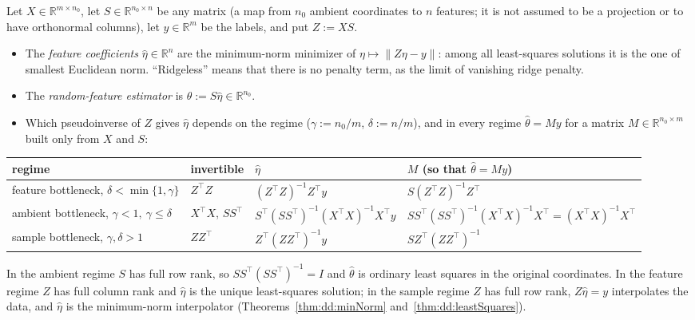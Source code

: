 \begin{definition}\label{def:dd:randomFeatures}
Let $X\in\mathbb R^{m\times n_0}$, let $S\in\mathbb R^{n_0\times n}$ be any matrix (a map from $n_0$ ambient coordinates to $n$ features; it is not assumed to be a projection or to have orthonormal columns), let $y\in\mathbb R^m$ be the labels, and put $Z:=XS$.
\begin{itemize}
  \item The \emph{feature coefficients} $\hat\eta\in\mathbb R^n$ are the minimum-norm minimizer of $\eta\mapsto\|Z\eta-y\|$: among all least-squares solutions it is the one of smallest Euclidean norm. ``Ridgeless'' means that there is no
  penalty term, as the limit of vanishing ridge penalty.
  \item The \emph{random-feature estimator} is $\hat\theta:=S\hat\eta\in\mathbb R^{n_0}$.
  \item Which pseudoinverse of $Z$ gives $\hat\eta$ depends on the regime ($\gamma:=n_0/m$, $\delta:=n/m$), and in every regime $\hat\theta=My$ for a matrix $M\in\mathbb R^{n_0\times m}$ built only from $X$ and $S$:
\end{itemize}
\begin{center}
\small
\begin{tabular}{p{}p{}p{}p{}}
regime & invertible & $\hat\eta$ & $M$ (so that $\hat\theta=My$)\\ \hline
feature bottleneck, $\delta<\min\{1,\gamma\}$ & $Z^\top Z$ & $(Z^\top Z)^{-1}Z^\top y$ & $S(Z^\top Z)^{-1}Z^\top$\\[0.5ex]
ambient bottleneck, $\gamma<1,\ \gamma\le\delta$ & $X^\top X$, $SS^\top$ &
$S^\top(SS^\top)^{-1}(X^\top X)^{-1}X^\top y$ & $SS^\top(SS^\top)^{-1}(X^\top X)^{-1}X^\top=(X^\top X)^{-1}X^\top$\\[0.5ex]
sample bottleneck, $\gamma,\delta>1$ & $ZZ^\top$ & $Z^\top(ZZ^\top)^{-1}y$ & $SZ^\top(ZZ^\top)^{-1}$
\end{tabular}
\end{center}
In the ambient regime $S$ has full row rank, so $SS^\top(SS^\top)^{-1}=I$ and $\hat\theta$ is ordinary least squares in the original coordinates. In the feature regime $Z$ has full column rank and $\hat\eta$ is the unique least-squares solution; in the sample regime $Z$ has full row rank,
$Z\hat\eta=y$ interpolates the data, and $\hat\eta$ is the minimum-norm interpolator (Theorems~\ref{thm:dd:minNorm} and~\ref{thm:dd:leastSquares}).


\end{definition}
